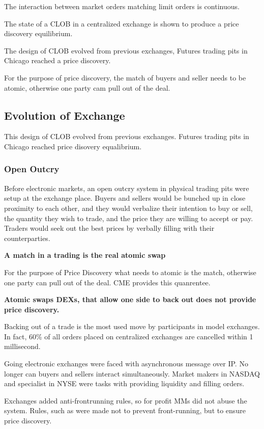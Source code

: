 \documentclass[12pt]{article}
\begin{document}
The interaction between market orders matching limit orders is continuous. 

The state of a CLOB in a centralized exchange is shown to produce a price discovery equilibrium. 

The design of CLOB evolved from previous exchanges, Futures trading pits in Chicago reached a price discovery. 

For the purpose of price discovery, the match of buyers and seller needs to be atomic, otherwise one party cam pull out of the deal. 


\subsection*{Evolution of Exchange}
This design of CLOB evolved from previous exchanges. Futures trading pits in Chicago reached price disovery equalibrium. 

\subsubsection*{Open Outcry}

Before electronic markets, an open outcry system in physical trading pits were setup at the exchange place. Buyers and sellers would be bunched up in close proximity to each other, and they would verbalize their intention to buy or sell, the quantity they wish to trade, and the price they are willing to accept or pay. Traders would seek out the best prices by verbally filling with their counterparties. 

\textbf{A match in a trading is the real atomic swap} 

For the purpose of Price Discovery what needs to atomic is the  match, otherwise one party can pull out of the deal. CME provides this quanrentee. 

\textbf{Atomic swaps DEXs, that allow one side to back out does not provide price discovery.}

Backing out of a trade is the most used move by participants in model exchanges. In fact, 60\%  of all orders placed on centralized exchanges are cancelled within 1 millisecond. 

Going electronic exchanges were faced with asynchronous message over IP. No longer can buyers and sellers interact simultaneously. Market makers in NASDAQ and specialist in NYSE were tasks with providing liquidity and filling orders. 

Exchanges added anti-frontrunning rules, so for profit MMs did not abuse the system. Rules, such as  were made not to prevent front-running, but to ensure price discovery. 
\end{document}
